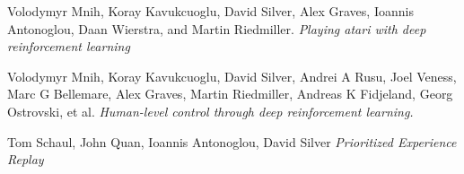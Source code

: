 \documentclass[10pt]{article}
\begin{document}
\begin{thebibliography}{9}
	
	 Volodymyr Mnih, Koray Kavukcuoglu, David Silver, Alex Graves,
	 Ioannis Antonoglou, Daan Wierstra, and Martin Riedmiller. \textit{Playing
	 atari with deep reinforcement learning}
	
	Volodymyr Mnih, Koray Kavukcuoglu, David Silver, Andrei A Rusu,
	Joel Veness, Marc G Bellemare, Alex Graves, Martin Riedmiller, Andreas
	K Fidjeland, Georg Ostrovski, et al. \textit{Human-level control through	deep reinforcement learning.}
	
	Tom Schaul, John Quan, Ioannis Antonoglou, David Silver
	\textit{Prioritized Experience Replay}
	
\end{thebibliography}
\end{document}
